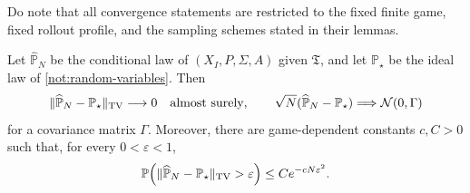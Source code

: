\documentclass[12pt, a4paper]{article}
\begin{document}
Do note that all convergence statements are restricted to the fixed finite game, fixed rollout profile, and the sampling schemes stated in their lemmas.

\begin{lemma}\label{lem:terminal-rollout-decision-law-convergence}
Let $\widehat{\mathbb P}_N$ be the conditional law of $(X_I,P,\Sigma,A)$ given $\mathfrak T$, and let $\mathbb P_\star$ be the ideal law of \autoref{not:random-variables}. Then
\[
  \|\widehat{\mathbb P}_N-\mathbb P_\star\|_{\rm TV}\longrightarrow 0
  \quad\textnormal{almost surely},
  \qquad
  \sqrt N(\widehat{\mathbb P}_N-\mathbb P_\star)\Longrightarrow\mathcal N(0,\Gamma)
\]
for a covariance matrix $\Gamma$. Moreover, there are game-dependent constants $c,C>0$ such that, for every $0<\varepsilon<1$,
\[
  \mathbb P\!\left(\|\widehat{\mathbb P}_N-\mathbb P_\star\|_{\rm TV}>\varepsilon\right)
  \leq C e^{-cN\varepsilon^2}.
\]
\end{lemma}
\end{document}

